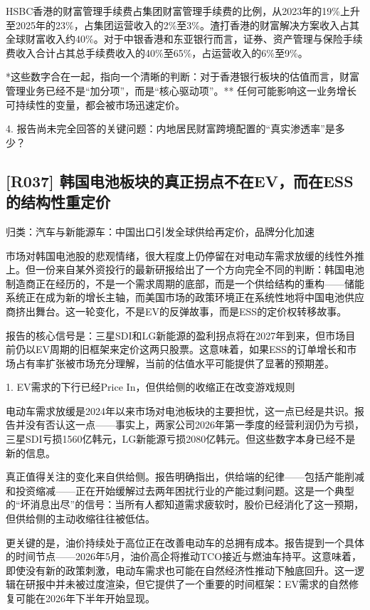 \documentclass[11pt]{ctexart}
\begin{document}
HSBC香港的财富管理手续费占集团财富管理手续费的比例，从2023年的19\%上升至2025年的23\%，占集团运营收入的2\%至3\%。渣打香港的财富解决方案收入占其全球财富收入约40\%。对于中银香港和东亚银行而言，证券、资产管理与保险手续费收入合计占其总手续费收入的40\%至65\%，占运营收入的6\%至9\%。

*这些数字合在一起，指向一个清晰的判断：对于香港银行板块的估值而言，财富管理业务已经不是“加分项”，而是“核心驱动项”。** 任何可能影响这一业务增长可持续性的变量，都会被市场迅速定价。

4. 报告尚未完全回答的关键问题：内地居民财富跨境配置的“真实渗透率”是多少？

\subsection{[R037] 韩国电池板块的真正拐点不在EV，而在ESS的结构性重定价}
{\small\color{refgray}归类：汽车与新能源车：中国出口引发全球供给再定价，品牌分化加速}

市场对韩国电池股的悲观情绪，很大程度上仍停留在对电动车需求放缓的线性外推上。但一份来自某外资投行的最新研报给出了一个方向完全不同的判断：韩国电池制造商正在经历的，不是一个需求周期的底部，而是一个供给结构的重构——储能系统正在成为新的增长主轴，而美国市场的政策环境正在系统性地将中国电池供应商挤出舞台。这一轮变化，不是EV的反弹故事，而是ESS的定价权转移故事。

报告的核心信号是：三星SDI和LG新能源的盈利拐点将在2027年到来，但市场目前仍以EV周期的旧框架来定价这两只股票。这意味着，如果ESS的订单增长和市场占有率扩张被市场充分理解，当前的估值水平可能提供了显著的预期差。

1. EV需求的下行已经Price In，但供给侧的收缩正在改变游戏规则

电动车需求放缓是2024年以来市场对电池板块的主要担忧，这一点已经是共识。报告并没有否认这一点——事实上，两家公司2026年第一季度的经营利润仍为亏损，三星SDI亏损1560亿韩元，LG新能源亏损2080亿韩元。但这些数字本身已经不是新的信息。

真正值得关注的变化来自供给侧。报告明确指出，供给端的纪律——包括产能削减和投资缩减——正在开始缓解过去两年困扰行业的产能过剩问题。这是一个典型的“坏消息出尽”的信号：当所有人都知道需求疲软时，股价已经消化了这一预期，但供给侧的主动收缩往往被低估。

更关键的是，油价持续处于高位正在改善电动车的总拥有成本。报告提到一个具体的时间节点——2026年5月，油价高企将推动TCO接近与燃油车持平。这意味着，即使没有新的政策刺激，电动车需求也可能在自然经济性推动下触底回升。这一逻辑在研报中并未被过度渲染，但它提供了一个重要的时间框架：EV需求的自然修复可能在2026年下半年开始显现。
\end{document}
